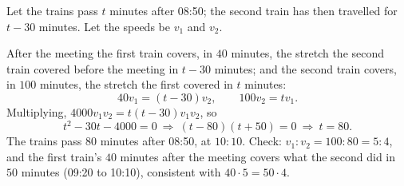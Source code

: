 Let the trains pass $t$ minutes after 08:50; the second train has then travelled for $t-30$ minutes. Let the speeds be $v_1$ and $v_2$.

After the meeting the first train covers, in $40$ minutes, the stretch the second train covered before the meeting in $t-30$ minutes; and the second train covers, in $100$ minutes, the stretch the first covered in $t$ minutes:
\[
40v_1=(t-30)v_2,\qquad 100v_2=tv_1 .
\]
Multiplying, $4000v_1v_2=t(t-30)v_1v_2$, so
\[
t^2-30t-4000=0\ \Longrightarrow\ (t-80)(t+50)=0\ \Longrightarrow\ t=80 .
\]
The trains pass $80$ minutes after 08:50, at $\boxed{10{:}10}$. Check: $v_1:v_2=100:80=5:4$, and the first train's $40$ minutes after the meeting covers what the second did in $50$ minutes (09:20 to 10:10), consistent with $40\cdot5=50\cdot4$.
